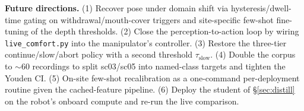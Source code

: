 \documentclass{article}
\newcommand{\code}[1]{\texttt{\small #1}}
\begin{document}
\textbf{Future directions.} (1) Recover pose under domain shift via hysteresis/dwell-time gating on withdrawal/mouth-cover triggers and site-specific few-shot fine-tuning of the depth thresholds. (2) Close the perception-to-action loop by wiring \code{live\_comfort.py} into the manipulator's controller. (3) Restore the three-tier continue/slow/abort policy with a second threshold $\tau_\text{slow}$. (4) Double the corpus to $\sim$60 recordings to split sc03/sc05 into named-class targets and tighten the Youden CI. (5) On-site few-shot recalibration as a one-command per-deployment routine given the cached-feature pipeline. (6) Deploy the student of \S\ref{sec:distill} on the robot's onboard compute and re-run the live comparison.


\end{document}
